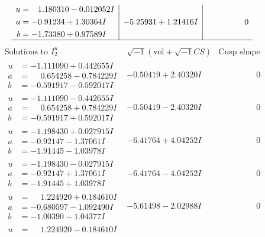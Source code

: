 \documentclass[1p]{elsarticle_modified}
\theoremstyle{definition}
\newcommand{\I}{\sqrt{-1}}
\begin{document}
$$\begin{array}{c|c|c}
\begin{aligned}
u &= \phantom{-}1.180310 - 0.012052 I \\
a &= -0.91234 + 1.30364 I \\
b &= -1.73380 + 0.97589 I\end{aligned}
 & -5.25931 + 1.21416 I & \phantom{-0.000000 } 0\\
 \hline 
 \end{array}$$\newpage$$\begin{array}{c|c|c}  
\text{Solutions to }I^u_{2}& \I (\text{vol} + \sqrt{-1}CS) & \text{Cusp shape}\\
 \hline 
\begin{aligned}
u &= -1.111090 + 0.442655 I \\
a &= \phantom{-}0.654258 - 0.784229 I \\
b &= -0.591917 - 0.592017 I\end{aligned}
 & -0.50419 + 2.40320 I & \phantom{-0.000000 } 0 \\ \hline\begin{aligned}
u &= -1.111090 - 0.442655 I \\
a &= \phantom{-}0.654258 + 0.784229 I \\
b &= -0.591917 + 0.592017 I\end{aligned}
 & -0.50419 - 2.40320 I & \phantom{-0.000000 } 0 \\ \hline\begin{aligned}
u &= -1.198430 + 0.027915 I \\
a &= -0.92147 - 1.37061 I \\
b &= -1.91445 - 1.03978 I\end{aligned}
 & -6.41764 + 4.04252 I & \phantom{-0.000000 } 0 \\ \hline\begin{aligned}
u &= -1.198430 - 0.027915 I \\
a &= -0.92147 + 1.37061 I \\
b &= -1.91445 + 1.03978 I\end{aligned}
 & -6.41764 - 4.04252 I & \phantom{-0.000000 } 0 \\ \hline\begin{aligned}
u &= \phantom{-}1.224920 + 0.184610 I \\
a &= -0.680597 - 1.092490 I \\
b &= -1.00390 - 1.04377 I\end{aligned}
 & -5.61498 - 2.02988 I & \phantom{-0.000000 } 0 \\ \hline\begin{aligned}
u &= \phantom{-}1.224920 - 0.184610 I \\

\end{aligned}
\end{array}$$
\end{document}
